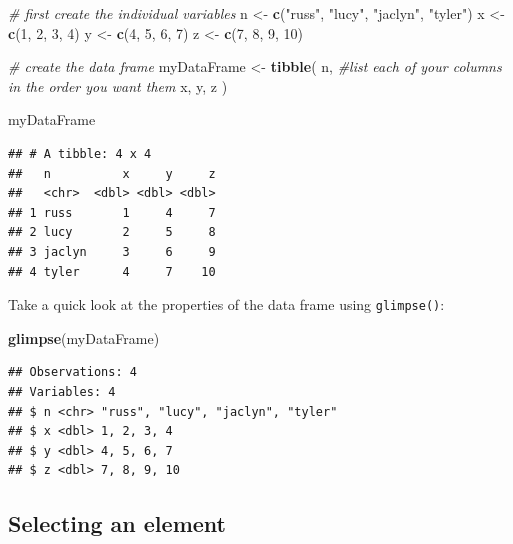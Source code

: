 \documentclass[12pt,]{book}
\newenvironment{Shaded}{\begin{snugshade}}{\end{snugshade}}
\newcommand{\CommentTok}[1]{\textcolor[rgb]{0.56,0.35,0.01}{\textit{#1}}}
\newcommand{\DecValTok}[1]{\textcolor[rgb]{0.00,0.00,0.81}{#1}}
\newcommand{\KeywordTok}[1]{\textcolor[rgb]{0.13,0.29,0.53}{\textbf{#1}}}
\newcommand{\NormalTok}[1]{#1}
\newcommand{\StringTok}[1]{\textcolor[rgb]{0.31,0.60,0.02}{#1}}
\begin{document}
\begin{Shaded}
\begin{Highlighting}[]
\CommentTok{# first create the individual variables}
\NormalTok{n <-}\StringTok{ }\KeywordTok{c}\NormalTok{(}\StringTok{"russ"}\NormalTok{, }\StringTok{"lucy"}\NormalTok{, }\StringTok{"jaclyn"}\NormalTok{, }\StringTok{"tyler"}\NormalTok{)}
\NormalTok{x <-}\StringTok{ }\KeywordTok{c}\NormalTok{(}\DecValTok{1}\NormalTok{, }\DecValTok{2}\NormalTok{, }\DecValTok{3}\NormalTok{, }\DecValTok{4}\NormalTok{)}
\NormalTok{y <-}\StringTok{ }\KeywordTok{c}\NormalTok{(}\DecValTok{4}\NormalTok{, }\DecValTok{5}\NormalTok{, }\DecValTok{6}\NormalTok{, }\DecValTok{7}\NormalTok{)}
\NormalTok{z <-}\StringTok{ }\KeywordTok{c}\NormalTok{(}\DecValTok{7}\NormalTok{, }\DecValTok{8}\NormalTok{, }\DecValTok{9}\NormalTok{, }\DecValTok{10}\NormalTok{)}

\CommentTok{# create the data frame}
\NormalTok{myDataFrame <-}
\StringTok{  }\KeywordTok{tibble}\NormalTok{(}
\NormalTok{    n, }\CommentTok{#list each of your columns in the order you want them}
\NormalTok{    x,}
\NormalTok{    y,}
\NormalTok{    z}
\NormalTok{  )}

\NormalTok{myDataFrame}
\end{Highlighting}
\end{Shaded}

\begin{verbatim}
## # A tibble: 4 x 4
##   n          x     y     z
##   <chr>  <dbl> <dbl> <dbl>
## 1 russ       1     4     7
## 2 lucy       2     5     8
## 3 jaclyn     3     6     9
## 4 tyler      4     7    10
\end{verbatim}

Take a quick look at the properties of the data frame using \texttt{glimpse()}:

\begin{Shaded}
\begin{Highlighting}[]
\KeywordTok{glimpse}\NormalTok{(myDataFrame) }
\end{Highlighting}
\end{Shaded}

\begin{verbatim}
## Observations: 4
## Variables: 4
## $ n <chr> "russ", "lucy", "jaclyn", "tyler"
## $ x <dbl> 1, 2, 3, 4
## $ y <dbl> 4, 5, 6, 7
## $ z <dbl> 7, 8, 9, 10
\end{verbatim}

\hypertarget{selecting-an-element}{%
\subsection{Selecting an element}\label{selecting-an-element}}
\end{document}
